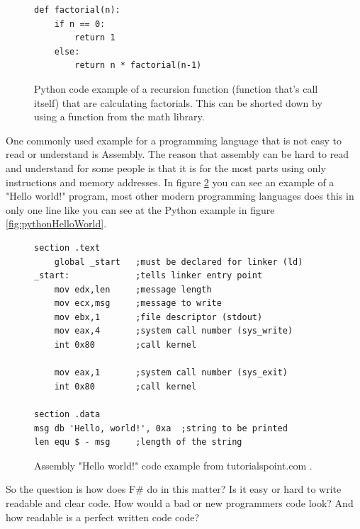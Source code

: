 \documentclass[12pt, a4paper]{article}
\begin{document}
\begin{figure}[!h]
	\begin{lstlisting}
def factorial(n):
    if n == 0:
        return 1
    else:
        return n * factorial(n-1)
	\end{lstlisting}
	\caption{Python code example of a recursion function (function that's call itself) that are calculating factorials. This can be shorted down by using a function from the math library.}
	\label{fig:pythonFactorial}
\end{figure}

\newpage
One commonly used example for a programming language that is not easy to read or understand is Assembly. The reason that assembly can be hard to read and understand for some people is that it is for the most parts using only instructions and memory addresses. In figure \ref{fig:assemblyExample} you can see an example of a "Hello world!" program, most other modern programming languages does this in only one line like you can see at the Python example in figure \ref{fig:pythonHelloWorld}.\\

\begin{figure}[!h]
	\begin{lstlisting}
section	.text
    global _start   ;must be declared for linker (ld)
_start:	            ;tells linker entry point
    mov	edx,len     ;message length
    mov	ecx,msg     ;message to write
    mov	ebx,1       ;file descriptor (stdout)
    mov	eax,4       ;system call number (sys_write)
    int	0x80        ;call kernel
	
    mov	eax,1       ;system call number (sys_exit)
    int	0x80        ;call kernel

section	.data
msg db 'Hello, world!', 0xa  ;string to be printed
len equ $ - msg     ;length of the string
	\end{lstlisting}
	\caption{Assembly "Hello world!" code example from tutorialspoint.com \cite{tutorialspoint}.}
	\label{fig:assemblyExample}
\end{figure}


So the question is how does F\# do in this matter? Is it easy or hard to write readable and clear code. How would a bad or new programmers code look? And how readable is a perfect written code code?
\end{document}
